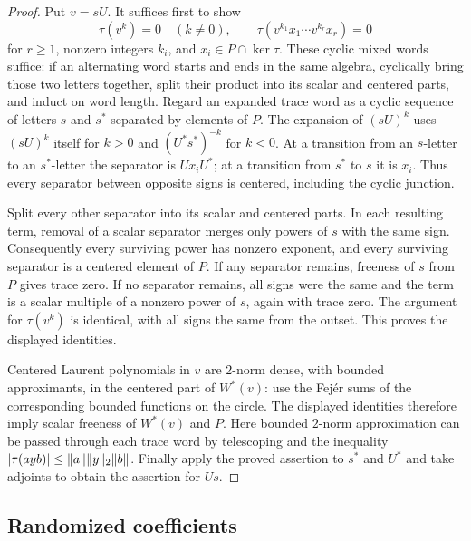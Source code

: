 \begin{proof}
Put $v=sU$.  It suffices first to show
\[
 \tau(v^k)=0\quad(k\neq0),\qquad
 \tau(v^{k_1}x_1\cdots v^{k_r}x_r)=0
\]
for $r\geq1$, nonzero integers $k_i$, and
$x_i\in P\cap\ker\tau$.  These cyclic mixed words suffice:
if an alternating word starts and ends in the same algebra,
cyclically bring those two letters together, split their product
into its scalar and centered parts, and induct on word length.
Regard an expanded trace word as a cyclic
sequence of letters $s$ and $s^*$ separated by elements of $P$.
The expansion of $(sU)^k$ uses $(sU)^k$ itself for $k>0$ and
$(U^*s^*)^{-k}$ for $k<0$.  At a transition from an $s$-letter to
an $s^*$-letter the separator is $Ux_iU^*$; at a transition from
$s^*$ to $s$ it is $x_i$.  Thus every separator between opposite
signs is centered, including the cyclic junction.

Split every other separator into its scalar and centered parts.
In each resulting term, removal of a scalar separator merges only
powers of $s$ with the same sign.  Consequently every surviving
power has nonzero exponent, and every surviving separator is a
centered element of $P$.  If any separator remains, freeness of
$s$ from $P$ gives trace zero.  If no separator remains, all signs
were the same and the term is a scalar multiple of a nonzero power
of $s$, again with trace zero.  The argument for $\tau(v^k)$ is
identical, with all signs the same from the outset.
This proves the displayed identities.

Centered Laurent polynomials in $v$ are $2$-norm dense, with
bounded approximants, in the centered part of $W^*(v)$: use the
Fej\'er sums of the corresponding bounded functions on the circle.
The displayed identities therefore imply scalar freeness of
$W^*(v)$ and $P$.  Here bounded $2$-norm approximation can be
passed through each trace word by telescoping and the inequality
$\lvert\tau(a y b)\rvert\leq\lVert a\rVert\lVert y\rVert_2\lVert b\rVert$.
Finally apply the proved assertion to $s^*$ and $U^*$ and take
adjoints to obtain the assertion for $Us$.
\end{proof}

\subsection{Randomized coefficients}

